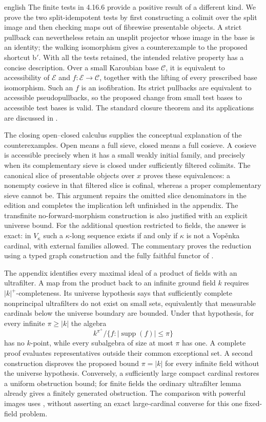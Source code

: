 \begin{otherlanguage*}{english}
The finite tests in 4.16.6 provide a positive result of a different kind. We prove the two split-idempotent tests by first constructing a colimit over the split image and then checking maps out of fibrewise presentable objects. A strict pullback can nevertheless retain an unsplit projector whose image in the base is an identity; the walking isomorphism gives a counterexample to the proposed shortcut b$'$. With all the tests retained, the intended relative property has a concise description. Over a small Karoubian base $\mathcal C$, it is equivalent to accessibility of $\mathcal E$ and $f:\mathcal E\to\mathcal C$, together with the lifting of every prescribed base isomorphism. Such an $f$ is an isofibration. Its strict pullbacks are equivalent to accessible pseudopullbacks, so the proposed change from small test bases to accessible test bases is valid. The standard closure theorem and its applications are discussed in \citet[Examples~4.8 and Remark~4.9, published version]{BourkeLack2024}.

The closing open--closed calculus supplies the conceptual explanation of the counterexamples. Open means a full sieve, closed means a full cosieve. A cosieve is accessible precisely when it has a small weakly initial family, and precisely when its complementary sieve is closed under sufficiently filtered colimits. The canonical slice of presentable objects over $x$ proves these equivalences: a nonempty cosieve in that filtered slice is cofinal, whereas a proper complementary sieve cannot be. This argument repairs the omitted slice denominators in the edition and completes the implication left unfinished in the appendix. The transfinite no-forward-morphism construction is also justified with an explicit universe bound. For the additional question restricted to fields, the answer is exact: in $V_\kappa$ such a $\kappa$-long sequence exists if and only if $\kappa$ is not a Vop\v{e}nka cardinal, with external families allowed. The commentary proves the reduction using a typed graph construction and the fully faithful functor of \citet{MillerPoonenSchoutensShlapentokh2018}.

The appendix identifies every maximal ideal of a product of fields with an ultrafilter. A map from the product back to an infinite ground field $k$ requires $|k|^+$-completeness. Its universe hypothesis says that sufficiently complete nonprincipal ultrafilters do not exist on small sets, equivalently that measurable cardinals below the universe boundary are bounded. Under that hypothesis, for every infinite $\pi\ge |k|$ the algebra
\[
 k^{\pi^+}/\{f:|\operatorname{supp}(f)|\le\pi\}
\]
has no $k$-point, while every subalgebra of size at most $\pi$ has one. A complete proof evaluates representatives outside their common exceptional set. A second construction disproves the proposed bound $\pi=|k|$ for every infinite field without the universe hypothesis. Conversely, a sufficiently large compact cardinal restores a uniform obstruction bound; for finite fields the ordinary ultrafilter lemma already gives a finitely generated obstruction. The comparison with powerful images uses \citet{BrookeTaylorRosicky2017}, without asserting an exact large-cardinal converse for this one fixed-field problem.


\end{otherlanguage*}
